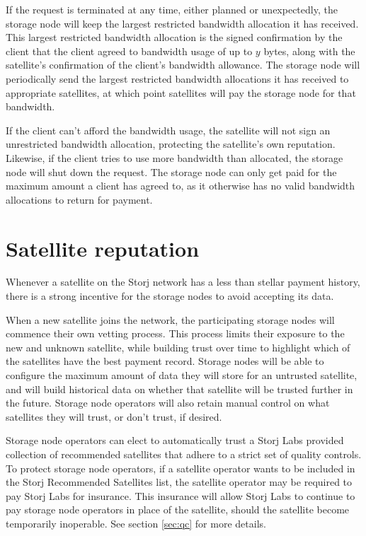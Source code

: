 \documentclass[11pt,fleqn,openany]{book}
\begin{document}
If the request is terminated at any time,
either planned or unexpectedly,
the storage node will keep the largest restricted bandwidth allocation it has
received.
This largest restricted bandwidth allocation is the signed confirmation
by the client that the client agreed to bandwidth usage of up to $y$
bytes, along with the satellite's confirmation of the client's bandwidth
allowance.
The storage node will periodically send the largest restricted bandwidth
allocations it has received to appropriate satellites, at which point
satellites will pay the storage node for that bandwidth.

If the client can't afford the bandwidth usage, the satellite will not sign an
unrestricted bandwidth allocation, protecting the satellite's own reputation.
Likewise, if the client tries to use more bandwidth than allocated,
the storage node will shut down the request.
The storage node can only get paid for the maximum amount a client has agreed
to,
as it otherwise has no valid bandwidth allocations to return for
payment.

\section{Satellite reputation}

Whenever a satellite on the Storj network has a less than stellar payment history,
there is a strong incentive for the storage nodes to avoid accepting its data.

When a new satellite joins the network, the participating storage nodes will
commence their own vetting process.
This process limits their exposure to the new and unknown
satellite, while building trust over time to highlight which of the
satellites have the best payment record.
Storage nodes will be able to configure the maximum amount of data they will
store for an untrusted satellite, and will build historical data on whether
that satellite will be trusted further in the future.
Storage node operators will also retain manual control on what satellites they
will trust, or don't trust, if desired.

Storage node operators can elect to automatically trust a Storj Labs
provided collection of recommended satellites that adhere to a strict set of
quality controls.
To protect storage node operators, if a satellite operator wants to be
included in the Storj Recommended Satellites list, the satellite operator may
be required to pay Storj Labs for insurance. This insurance will allow Storj
Labs to continue to pay storage node operators in place of the satellite, should
the satellite become temporarily inoperable.
See section \ref{sec:qc} for more details.
\end{document}
